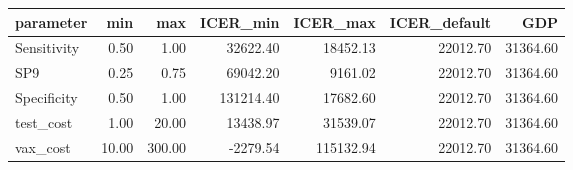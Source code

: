 \begin{tabular}{lrrrrrr}
  \hline
parameter & min & max & ICER\_min & ICER\_max & ICER\_default & GDP \\ 
  \hline
Sensitivity & 0.50 & 1.00 & 32622.40 & 18452.13 & 22012.70 & 31364.60 \\ 
  SP9 & 0.25 & 0.75 & 69042.20 & 9161.02 & 22012.70 & 31364.60 \\ 
  Specificity & 0.50 & 1.00 & 131214.40 & 17682.60 & 22012.70 & 31364.60 \\ 
  test\_cost & 1.00 & 20.00 & 13438.97 & 31539.07 & 22012.70 & 31364.60 \\ 
  vax\_cost & 10.00 & 300.00 & -2279.54 & 115132.94 & 22012.70 & 31364.60 \\ 
   \hline
\end{tabular}
